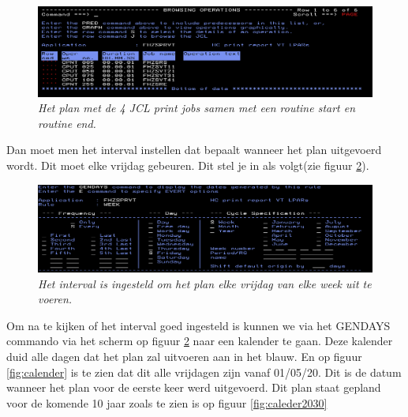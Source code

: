 \begin{figure}[h]
	\centering
	\includegraphics[width=1\linewidth]{img/IWS}
	\caption[Plan voor de print jobs]{{\small \textit{Het plan met de 4 JCL print jobs samen met een routine start en routine end.}}}
	\label{fig:iws}
\end{figure}

 Dan moet men het interval instellen dat bepaalt wanneer het plan uitgevoerd wordt. Dit moet elke vrijdag gebeuren. Dit stel je in als volgt(zie figuur \ref{fig:interval}).

\begin{figure}[h]
	\centering
	\includegraphics[width=1\linewidth]{img/Interval}
	\caption[Interval in IWS]{{\small \textit{Het interval is ingesteld om het plan elke vrijdag van elke week uit te voeren.}}}
	\label{fig:interval}
\end{figure}

Om na te kijken of het interval goed ingesteld is kunnen we via het GENDAYS commando via het scherm op figuur \ref{fig:interval} naar een kalender te gaan. Deze kalender duid alle dagen dat het plan zal uitvoeren aan in het blauw. En op figuur \ref{fig:calender} is te zien dat dit alle vrijdagen zijn vanaf 01/05/20. Dit is de datum wanneer het plan voor de eerste keer werd uitgevoerd. Dit plan staat gepland voor de komende 10 jaar zoals te zien is op figuur \ref{fig:caleder2030}

